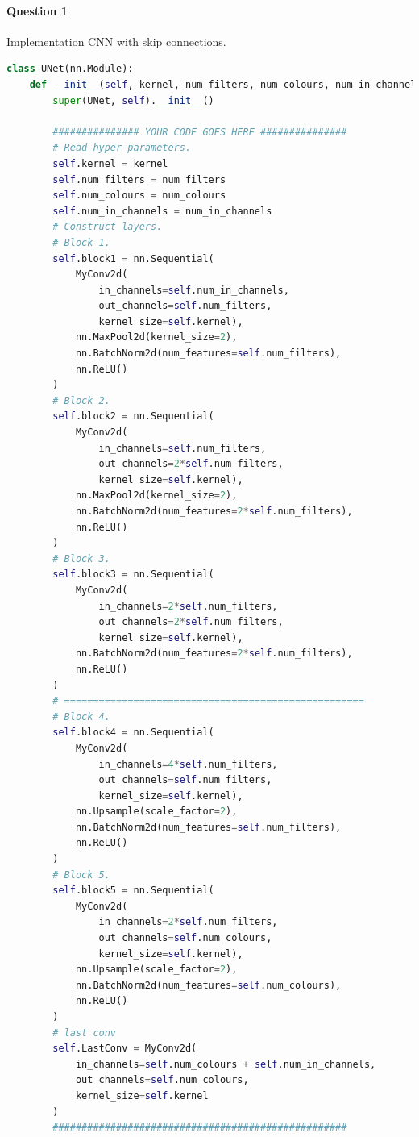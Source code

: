 \documentclass[12pt]{article}
\begin{document}
	\paragraph{Question 1} Implementation CNN with skip connections.
	\begin{lstlisting}[language=python]
class UNet(nn.Module):
    def __init__(self, kernel, num_filters, num_colours, num_in_channels):
        super(UNet, self).__init__()

        ############### YOUR CODE GOES HERE ###############
        # Read hyper-parameters.
        self.kernel = kernel
        self.num_filters = num_filters
        self.num_colours = num_colours
        self.num_in_channels = num_in_channels
        # Construct layers.
        # Block 1.
        self.block1 = nn.Sequential(
            MyConv2d(
                in_channels=self.num_in_channels,
                out_channels=self.num_filters,
                kernel_size=self.kernel),
            nn.MaxPool2d(kernel_size=2),
            nn.BatchNorm2d(num_features=self.num_filters),
            nn.ReLU()
        )
        # Block 2.
        self.block2 = nn.Sequential(
            MyConv2d(
                in_channels=self.num_filters,
                out_channels=2*self.num_filters,
                kernel_size=self.kernel),
            nn.MaxPool2d(kernel_size=2),
            nn.BatchNorm2d(num_features=2*self.num_filters),
            nn.ReLU()
        )
        # Block 3.
        self.block3 = nn.Sequential(
            MyConv2d(
                in_channels=2*self.num_filters,
                out_channels=2*self.num_filters,
                kernel_size=self.kernel),
            nn.BatchNorm2d(num_features=2*self.num_filters),
            nn.ReLU()
        )
        # ====================================================
        # Block 4.
        self.block4 = nn.Sequential(
            MyConv2d(
                in_channels=4*self.num_filters,
                out_channels=self.num_filters,
                kernel_size=self.kernel),
            nn.Upsample(scale_factor=2),
            nn.BatchNorm2d(num_features=self.num_filters),
            nn.ReLU()
        )
        # Block 5.
        self.block5 = nn.Sequential(
            MyConv2d(
                in_channels=2*self.num_filters,
                out_channels=self.num_colours,
                kernel_size=self.kernel),
            nn.Upsample(scale_factor=2),
            nn.BatchNorm2d(num_features=self.num_colours),
            nn.ReLU()
        )
        # last conv
        self.LastConv = MyConv2d(
            in_channels=self.num_colours + self.num_in_channels,
            out_channels=self.num_colours,
            kernel_size=self.kernel
        )
        ###################################################


\end{lstlisting}
\end{document}

